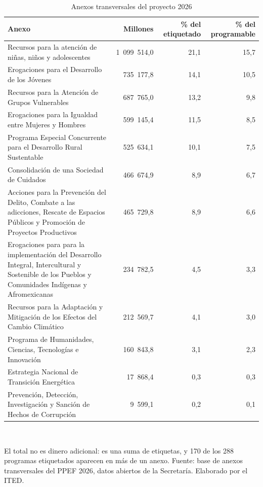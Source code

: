 \begin{table}[htbp]
\centering
\scriptsize
\caption{Anexos transversales del proyecto 2026}
\label{cua:C12_1}
\begin{tabular}{p{9.6cm}rrr}
\toprule
\textbf{Anexo} & \textbf{Millones} & \textbf{\% del etiquetado} & \textbf{\% del programable} \\
\midrule
Recursos para la atención de niñas, niños y adolescentes & 1 099 514,0 & 21,1 & 15,7 \\
Erogaciones para el Desarrollo de los Jóvenes & 735 177,8 & 14,1 & 10,5 \\
Recursos para la Atención de Grupos Vulnerables & 687 765,0 & 13,2 & 9,8 \\
Erogaciones para la Igualdad entre Mujeres y Hombres & 599 145,4 & 11,5 & 8,5 \\
Programa Especial Concurrente para el Desarrollo Rural Sustentable & 525 634,1 & 10,1 & 7,5 \\
Consolidación de una Sociedad de Cuidados & 466 674,9 & 8,9 & 6,7 \\
Acciones para la Prevención del Delito, Combate a las adicciones, Rescate de Espacios Públicos y Promoción de Proyectos Productivos & 465 729,8 & 8,9 & 6,6 \\
Erogaciones para para la implementación del Desarrollo Integral, Intercultural y Sostenible de los Pueblos y Comunidades Indígenas y Afromexicanas & 234 782,5 & 4,5 & 3,3 \\
Recursos para la Adaptación y Mitigación de los Efectos del Cambio Climático & 212 569,7 & 4,1 & 3,0 \\
Programa de Humanidades, Ciencias, Tecnologías e Innovación & 160 843,8 & 3,1 & 2,3 \\
Estrategia Nacional de Transición Energética & 17 868,4 & 0,3 & 0,3 \\
Prevención, Detección, Investigación y Sanción de Hechos de Corrupción & 9 599,1 & 0,2 & 0,1 \\
\bottomrule
\end{tabular}
\\[2pt]\begin{minipage}{0.92\textwidth}\scriptsize El total no es dinero adicional: es una suma de etiquetas, y 170 de los 288 programas etiquetados aparecen en más de un anexo. Fuente: base de anexos transversales del PPEF 2026, datos abiertos de la Secretaría. Elaborado por el ITED.\end{minipage}
\end{table}
